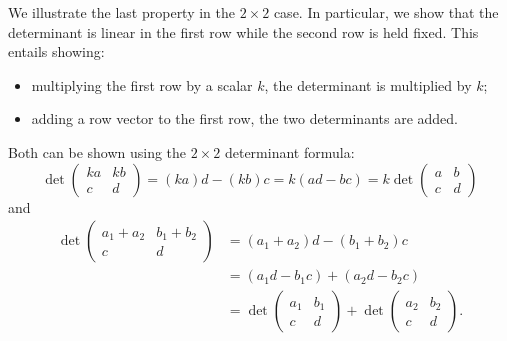 \documentclass{ximera}
\begin{document}
We illustrate the last property in the $2 \times 2$ case. In particular, we
show that the determinant is linear in the first row while the second
row is held fixed. This entails showing:
\begin{itemize}
\item multiplying the first row by a scalar $k$, the determinant is
  multiplied by $k$;
\item adding a row vector to the first row, the two determinants are added.
\end{itemize}

Both can be shown using the $2 \times 2$ determinant formula:
\[
  \det
  \begin{pmatrix}
    k a & k b \\
    c & d
  \end{pmatrix}
  = (k a)d - (k b)c
  = k (ad - bc)
  = k \det
  \begin{pmatrix}
    a & b \\
    c & d
  \end{pmatrix}
\]
and
\begin{align*}
  \det
  \begin{pmatrix}
    a_1 + a_2 & b_1 + b_2 \\
    c & d
  \end{pmatrix}
  & = (a_1 + a_2) d - (b_1 + b_2) c \\
  & = (a_1 d - b_1 c) + (a_2 d - b_2 c) \\
  & = \det
  \begin{pmatrix}
    a_1 & b_1 \\
    c & d
  \end{pmatrix}
  + \det
  \begin{pmatrix}
    a_2 & b_2 \\
    c & d
  \end{pmatrix}.
\end{align*}
\end{document}
